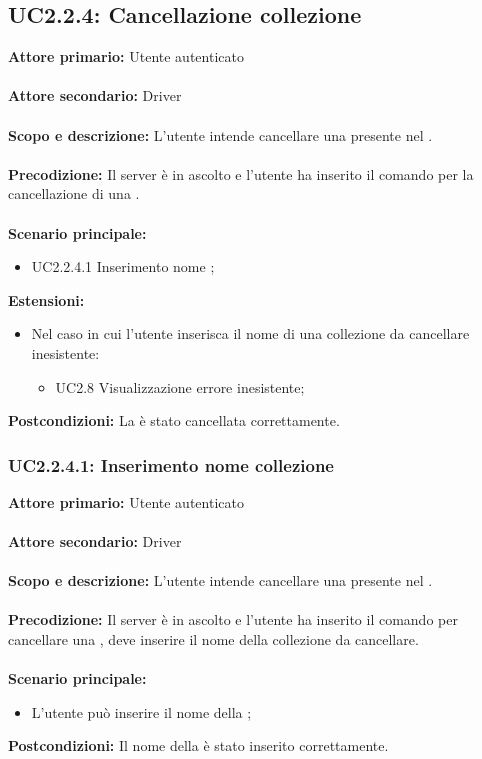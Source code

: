 \documentclass{scalatekids-article}
\begin{document}
\subsection{UC2.2.4: Cancellazione collezione}

\textbf{Attore primario:} Utente autenticato\\ \\
\textbf{Attore secondario:} Driver\\ \\
\textbf{Scopo e descrizione:} L’utente intende cancellare una  presente nel .\\ \\
\textbf{Precodizione:} Il server è in ascolto e l’utente ha inserito il comando per la cancellazione di una .\\ \\
\textbf{Scenario principale:}
\begin{itemize}
\item UC2.2.4.1 Inserimento nome ;
\end{itemize}
\textbf{Estensioni:}
\begin{itemize}
\item Nel caso in cui l'utente inserisca il nome di una collezione da cancellare inesistente:
  \begin{itemize}
  \item UC2.8 Visualizzazione errore  inesistente;
  \end{itemize}
\end{itemize}
\textbf{Postcondizioni:} La  è stato cancellata correttamente.

\subsubsection{UC2.2.4.1: Inserimento nome collezione}

\textbf{Attore primario:} Utente autenticato\\ \\
\textbf{Attore secondario:} Driver\\ \\
\textbf{Scopo e descrizione:} L’utente intende cancellare una  presente nel .\\ \\
\textbf{Precodizione:} Il server è in ascolto e l’utente ha inserito il comando per cancellare una , deve inserire il nome della collezione da cancellare.\\ \\
\textbf{Scenario principale:}
\begin{itemize}
\item L'utente può inserire il nome della ;
\end{itemize}
\textbf{Postcondizioni:} Il nome della  è stato inserito correttamente.
\end{document}
